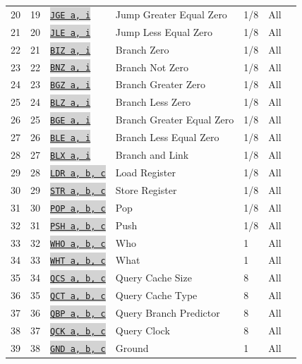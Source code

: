 \documentclass{article}
\newcommand{\vnscode}[1]{\colorbox{lightgray}{\lstinline[language=vns]{#1}}}
\begin{document}
\begin{longtable}{lllllll}
    20 & 19 & \hyperref[table:branch]{\vnscode{JGE a, i}} & Jump Greater Equal Zero & 1/8 & All \\
    21 & 20 & \hyperref[table:branch]{\vnscode{JLE a, i}} & Jump Less Equal Zero & 1/8 & All \\
    22 & 21 & \hyperref[table:branch]{\vnscode{BIZ a, i}} & Branch Zero & 1/8 & All \\
    23 & 22 & \hyperref[table:branch]{\vnscode{BNZ a, i}} & Branch Not Zero & 1/8 & All \\
    24 & 23 & \hyperref[table:branch]{\vnscode{BGZ a, i}} & Branch Greater Zero & 1/8 & All \\
    25 & 24 & \hyperref[table:branch]{\vnscode{BLZ a, i}} & Branch Less Zero & 1/8 & All \\
    26 & 25 & \hyperref[table:branch]{\vnscode{BGE a, i}} & Branch Greater Equal Zero & 1/8 & All \\
    27 & 26 & \hyperref[table:branch]{\vnscode{BLE a, i}} & Branch Less Equal Zero & 1/8 & All \\
    28 & 27 & \hyperref[table:branch]{\vnscode{BLX a, i}} & Branch and Link & 1/8 & All \\
    29 & 28 & \hyperref[table:memory]{\vnscode{LDR a, b, c}} & Load Register & 1/8 & All \\
    30 & 29 & \hyperref[table:memory]{\vnscode{STR a, b, c}} & Store Register & 1/8 & All \\
    31 & 30 & \hyperref[table:memory]{\vnscode{POP a, b, c}} & Pop & 1/8 & All \\
    32 & 31 & \hyperref[table:memory]{\vnscode{PSH a, b, c}} & Push & 1/8 & All \\
    33 & 32 & \hyperref[table:query]{\vnscode{WHO a, b, c}} & Who & 1 & All \\
    34 & 33 & \hyperref[table:query]{\vnscode{WHT a, b, c}} & What & 1 & All \\
    35 & 34 & \hyperref[table:query]{\vnscode{QCS a, b, c}} & Query Cache Size & 8 & All \\
    36 & 35 & \hyperref[table:query]{\vnscode{QCT a, b, c}} & Query Cache Type & 8 & All \\
    37 & 36 & \hyperref[table:query]{\vnscode{QBP a, b, c}} & Query Branch Predictor & 8 & All \\
    38 & 37 & \hyperref[table:query]{\vnscode{QCK a, b, c}} & Query Clock & 8 & All \\
    39 & 38 & \hyperref[table:query]{\vnscode{GND a, b, c}} & Ground & 1 & All \\

\end{longtable}
\end{document}
